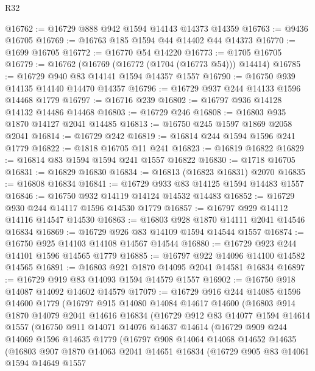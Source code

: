 \begin{lexlean}{R32}
\begin{coremodule}
@16762 := @16729 @888 @942 @1594 @14143 @14373 @14359
@16763 := @9436 @16705
@16769 := @16763 @185 @1594 @44 @14402 @44 @14373
@16770 := @1699 @16705
@16772 := @16770 @54 @14220
@16773 := @1705 @16705
@16779 := @16762 (@16769 (@16772 (@1704 (@16773 @54))) @14414)
@16785 := @16729 @940 @83 @14141 @1594 @14357 @1557
@16790 := @16750 @939 @14135 @14140 @14470 @14357
@16796 := @16729 @937 @244 @14133 @1596 @14468 @1779
@16797 := @16716 @239
@16802 := @16797 @936 @14128 @14132 @14486 @14468
@16803 := @16729 @246
@16808 := @16803 @935 @1870 @14127 @2041 @14485
@16813 := @16750 @245 @1597 @1869 @2058 @2041
@16814 := @16729 @242
@16819 := @16814 @244 @1594 @1596 @241 @1779
@16822 := @1818 @16705 @11 @241
@16823 := @16819 @16822
@16829 := @16814 @83 @1594 @1594 @241 @1557 @16822
@16830 := @1718 @16705
@16831 := @16829 @16830
@16834 := @16813 (@16823 @16831) @2070
@16835 := @16808 @16834
@16841 := @16729 @933 @83 @14125 @1594 @14483 @1557
@16846 := @16750 @932 @14119 @14124 @14532 @14483
@16852 := @16729 @930 @244 @14117 @1596 @14530 @1779
@16857 := @16797 @929 @14112 @14116 @14547 @14530
@16863 := @16803 @928 @1870 @14111 @2041 @14546 @16834
@16869 := @16729 @926 @83 @14109 @1594 @14544 @1557
@16874 := @16750 @925 @14103 @14108 @14567 @14544
@16880 := @16729 @923 @244 @14101 @1596 @14565 @1779
@16885 := @16797 @922 @14096 @14100 @14582 @14565
@16891 := @16803 @921 @1870 @14095 @2041 @14581 @16834
@16897 := @16729 @919 @83 @14093 @1594 @14579 @1557
@16902 := @16750 @918 @14087 @14092 @14602 @14579
@17079 := @16729
    @916
    @244
    @14085
    @1596
    @14600
    @1779
    (@16797
      @915
      @14080
      @14084
      @14617
      @14600
      (@16803
        @914
        @1870
        @14079
        @2041
        @14616
        @16834
        (@16729
          @912
          @83
          @14077
          @1594
          @14614
          @1557
          (@16750
            @911
            @14071
            @14076
            @14637
            @14614
            (@16729
              @909
              @244
              @14069
              @1596
              @14635
              @1779
              (@16797
                @908
                @14064
                @14068
                @14652
                @14635
                (@16803
                  @907
                  @1870
                  @14063
                  @2041
                  @14651
                  @16834
                  (@16729
                    @905
                    @83
                    @14061
                    @1594
                    @14649
                    @1557

\end{coremodule}
\end{lexlean}
